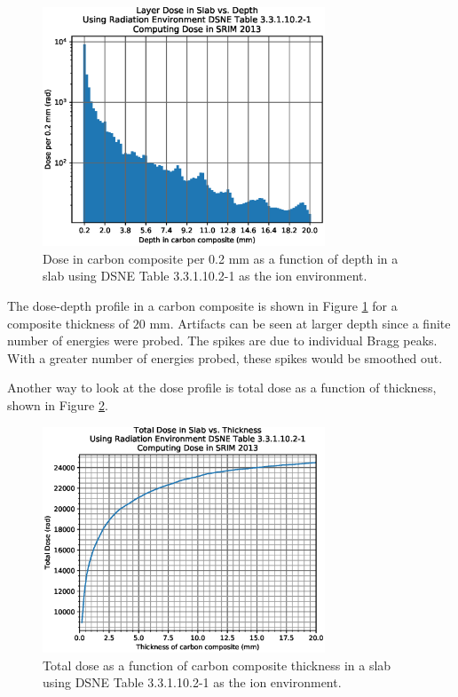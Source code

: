 \documentclass{hitec}
\begin{document}
\begin{figure}[h!]
	\centering
	\includegraphics[width=0.75\textwidth]{LayerDoseinSlab_vs_Depth.eps}
	\caption{Dose in carbon composite per 0.2 mm as a function of depth in a slab using DSNE Table 3.3.1.10.2-1 as the ion environment.}\label{fig:LayerDoseinSlab_vs_Depth}
\end{figure}

The dose-depth profile in a carbon composite is shown in Figure \ref{fig:LayerDoseinSlab_vs_Depth} for a composite thickness of $20$ mm. Artifacts can be seen at larger depth since a finite number of energies were probed. The spikes are due to individual Bragg peaks. With a greater number of energies probed, these spikes would be smoothed out.

Another way to look at the dose profile is total dose as a function of thickness, shown in Figure \ref{fig:TotalDoseinSlab_vs_Thickness}.

\begin{figure}[h!]
	\centering
	\includegraphics[width=0.75\textwidth]{TotalDoseinSlab_vs_Thickness.eps}
	\caption{Total dose as a function of carbon composite thickness in a slab using DSNE Table 3.3.1.10.2-1 as the ion environment.}\label{fig:TotalDoseinSlab_vs_Thickness}
\end{figure}
\end{document}
